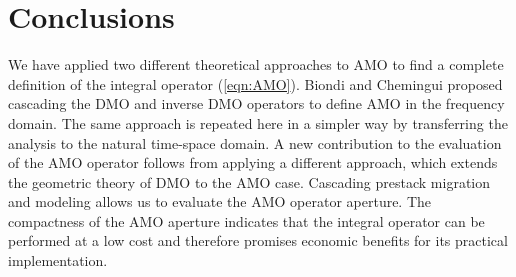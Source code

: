 \section{Conclusions}

We have applied two different theoretical approaches to AMO to find a
complete definition of the integral
operator (\ref{eqn:AMO}). Biondi and Chemingui 
proposed cascading the DMO and inverse DMO operators to define AMO in
the frequency domain. The
same approach is repeated here in a simpler way by transferring the
analysis to the natural time-space domain. A new contribution to the
evaluation of the AMO operator follows from applying a different
approach, which extends the geometric theory of DMO
\cite{GPR29-03-03740406} to the AMO case. Cascading prestack
migration and modeling allows us to evaluate the AMO operator aperture.
The compactness of the AMO aperture indicates that the integral operator can be
performed at a low cost and therefore
promises economic benefits for its practical implementation.



\appendix
